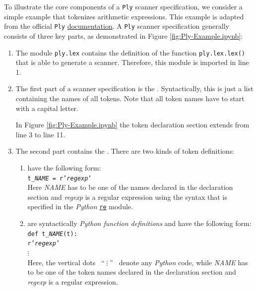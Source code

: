 To illustrate the core components of a \texttt{Ply} scanner specification, we consider a simple example that
tokenizes arithmetic expressions. This example is adapted from the official \texttt{Ply}
\href{https://ply.readthedocs.io/en/latest/ply.html#specification-of-tokens}{documentation}. A \texttt{Ply}
scanner specification generally consists of three key parts, as demonstrated in Figure
\ref{fig:Ply-Example.ipynb}: 
\begin{enumerate}
\item The module \texttt{ply.lex} contains the definition of the function \texttt{ply.lex.lex()}
      that is able to generate a scanner.
      Therefore, this module is imported in line 1.
\item The first part of a scanner specification is the .
      Syntactically, this is just a list containing the names of all tokens.  Note that all token names have to
      start with a capital 
      letter.

      In Figure \ref{fig:Ply-Example.ipynb} the token declaration section extends from line 3 to line 11.
\item The second part contains the .  There are two kinds of token definitions:
      \begin{enumerate}
      \item {}  have the following form:
            \\[0.2cm]
            \hspace*{1.3cm}
            \texttt{t\_\textsl{NAME} = r'\textsl{regexp}'}
            \\[0.2cm]
            Here \textsl{NAME} has to be one of the names declared in the declaration section and
            \textsl{regexp} is a regular expression using the syntax that is specified in the 
            \textsl{Python} \href{https://docs.python.org/3/library/re.html}{\texttt{re}} module.
      \item {}  are syntactically
            \textsl{Python function definitions} and have the following form:
            \\[0.2cm]
            \hspace*{1.3cm}
            \texttt{def t\_\textsl{NAME}(t):} \\
            \hspace*{2.05cm}
            \texttt{r'\textsl{regexp}'} \\
            \hspace*{2.8cm} $\vdots$ \\[0.2cm]
            Here, the vertical dots \ ``$\;\vdots\;$'' \ denote any \textsl{Python} code, while
            \textsl{NAME} has to be one of the token names declared in the declaration section and
            \textsl{regexp} is a regular expression.
            

\end{enumerate}
\end{enumerate}
